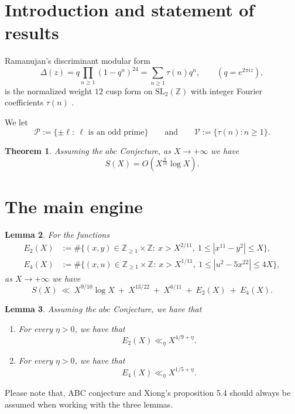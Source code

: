 \documentclass[12pt]{amsart}
\newtheorem{theorem}{Theorem}
\newtheorem{lemma}[theorem]{Lemma}
\theoremstyle{remark}
\numberwithin{equation}{section}
\begin{document}
\section{Introduction and statement of results}

Ramanujan's discriminant modular form
\begin{equation}\label{eq:delta}
\Delta(z)=q\prod_{n\ge 1}(1-q^n)^{24}=\sum_{n\ge 1}\tau(n)q^n,\qquad (q=e^{2\pi i z}),
\end{equation}
is the normalized weight $12$ cusp form on $\mathrm{SL}_2(\mathbb Z)$ with integer Fourier coefficients
$\tau(n)$ \cite{Ramanujan1916}.

We let
\begin{equation}
\mathcal P:=\{\pm \ell:\ \ell \text{ is an odd prime}\}
\qquad  {\text {and}} \qquad
\mathcal V:=\{\tau(n):n\ge 1\}.
\end{equation}

\begin{theorem}\label{thm:main}
Assuming the $abc$ Conjecture, as $X\rightarrow +\infty$ we have
$$
S(X) = O(X^{\frac{9}{10}}\log X).
$$
\end{theorem}

\section{The main engine}

\begin{lemma}\label{lem:reduction}
For the functions
\begin{displaymath}
\begin{split}
E_2(X)&:=\#\{(x,y)\in\mathbb Z_{\ge 1}\times\mathbb Z:\ x> X^{2/11},\ 1\le |x^{11}-y^2|\le X\},\\
E_4(X)&:=\#\{(x,u)\in\mathbb Z_{\ge 1}\times\mathbb Z:\ x> X^{1/11},\ 1\le |u^2-5x^{22}|\le 4X\},
\end{split}
\end{displaymath}
as $X\rightarrow +\infty$ we have
\[
S(X)\ \ll\ X^{9/10}\log X\ +\ X^{13/22}\ +\ X^{6/11}\ +\ E_2(X)\ +\ E_4(X).
\]
\end{lemma}

\begin{lemma}\label{lem:main_engine}
Assuming the $abc$ Conjecture, we have that
\begin{enumerate}
\item[(i)] For every $\eta>0$, we have that
$$E_2(X)\ll_{\eta} X^{4/9+\eta}.
$$
\item[(ii)] For every $\eta>0$, we have that
$$E_4(X)\ll_{\eta} X^{1/5+\eta}.
$$
\end{enumerate}
\end{lemma}

Please note that, ABC conjecture and Xiong's proposition 5.4 should always be assumed when working with the three lemmas.
\end{document}
